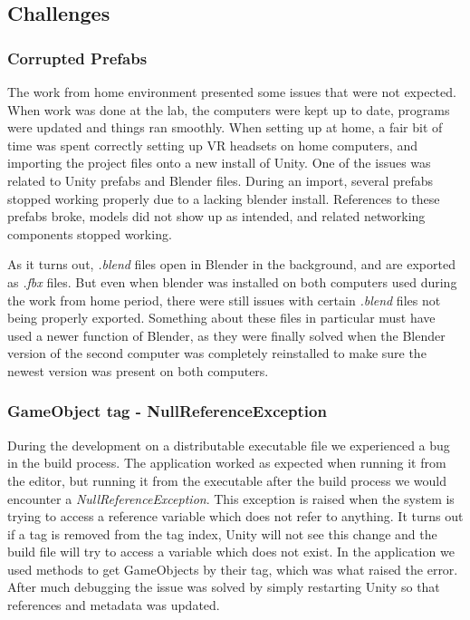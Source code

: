 \subsection{Challenges}

\subsubsection{Corrupted Prefabs}
The work from home environment presented some issues that were not expected. When work was done at the lab, the computers were kept up to date, programs were updated and things ran smoothly. When setting up at home, a fair bit of time was spent correctly setting up VR headsets on home computers, and importing the project files onto a new install of Unity. One of the issues was related to Unity prefabs and Blender files. During an import, several prefabs stopped working properly due to a lacking blender install. References to these prefabs broke, models did not show up as intended, and related networking components stopped working. 

As it turns out, \textit{.blend} files open in Blender in the background, and are exported as \textit{.fbx} files. But even when blender was installed on both computers used during the work from home period, there were still issues with certain \textit{.blend} files not being properly exported. Something about these files in particular must have used a newer function of Blender, as they were finally solved when the Blender version of the second computer was completely reinstalled to make sure the newest version was present on both computers. 



\subsubsection{GameObject tag - NullReferenceException}
During the development on a distributable executable file we experienced a bug in the build process. The application worked as expected when running it from the editor, but running it from the executable after the build process we would encounter a \textit{NullReferenceException}. This exception is raised when the system is trying to access a reference variable which does not refer to anything. It turns out if a tag is removed from the tag index, Unity will not see this change and the build file will try to access a variable which does not exist. In the application we used methods to get GameObjects by their tag, which was what raised the error. After much debugging the issue was solved by simply restarting Unity so that references and metadata was updated.  


